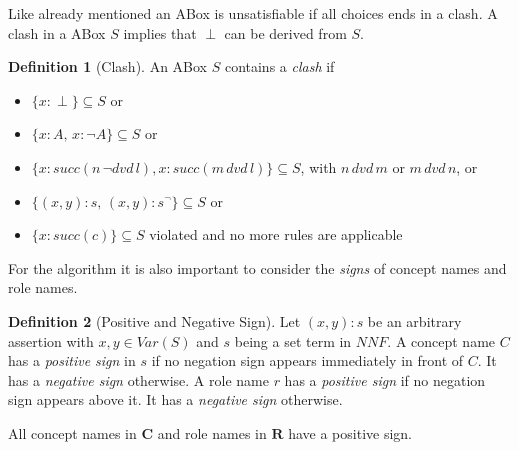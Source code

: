 \documentclass[a4paper,11pt]{scrartcl}
\theoremstyle{break}
\theoremstyle{definition}
\newtheorem{mydef}{Definition}
\begin{document}
Like already mentioned an ABox is unsatisfiable if all choices ends in a clash. A clash in a ABox $S$ implies that $\perp$ can be derived from $S$.
\begin{mydef}[Clash]
An ABox $S$ contains a \textit{clash} if
\begin{itemize}
\item $\{x:\perp\}\subseteq S$ or
\item $\{x:A,\,x:\neg A\}\subseteq S$ or
\item $\{x:succ(n\,\neg dvd\,l),x:succ(m\,dvd\,l)\}\subseteq S$, with $n\,dvd\,m$ or $m\,dvd\,n$, or
\item $\{(x,y):s,\,(x,y):s^\neg\}\subseteq S$ or
\item $\{x:succ(c)\}\subseteq S$ violated and no more rules are applicable
\end{itemize}
\end{mydef}
For the algorithm it is also important to consider the \textit{signs} of concept names and role names.
\begin{mydef}[Positive and Negative Sign]
Let $(x,y):s$ be an arbitrary assertion with $x,y\in Var(S)$ and $s$ being a set term in $NNF$. A concept name $C$ has a \textit{positive sign} in $s$ if no negation sign appears immediately in front of $C$. It has a \textit{negative sign} otherwise. A role name $r$ has a \textit{positive sign} if no negation sign appears above it. It has a \textit{negative sign} otherwise.
\end{mydef}
All concept names in $\mathbf{C}$ and role names in $\mathbf{R}$ have a positive sign.
\end{document}
